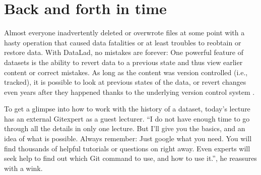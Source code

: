 \sphinxstepscope


\section{Back and forth in time}
\label{\detokenize{basics/101-137-history:back-and-forth-in-time}}\label{\detokenize{basics/101-137-history:history}}\label{\detokenize{basics/101-137-history::doc}}
\sphinxAtStartPar
Almost everyone inadvertently deleted or overwrote files at some point with
a hasty operation that caused data fatalities or at least troubles to
reobtain or restore data.
With DataLad, no mistakes are forever: One powerful feature of datasets
is the ability to revert data to a previous state and thus view earlier content or
correct mistakes. As long as the content was version controlled (i.e., tracked),
it is possible to look at previous states of the data, or revert changes \textendash{}
even years after they happened \textendash{} thanks to the underlying version control
system {\hyperref[\detokenize{glossary:term-Git}]{}}.

\begin{figure}[tbp]
\centering

\noindent{}
\end{figure}

\sphinxAtStartPar
To get a glimpse into how to work with the history of a dataset, today’s lecture
has an external Git\sphinxhyphen{}expert as a guest lecturer.
“I do not have enough time to go through all the details in only
one lecture. But I’ll give you the basics, and an idea of what is possible.
Always remember: Just google what you need. You will find thousands of helpful tutorials
or questions on  right away.
Even experts will  seek help to find out which Git command to
use, and how to use it.”, he reassures with a wink.

